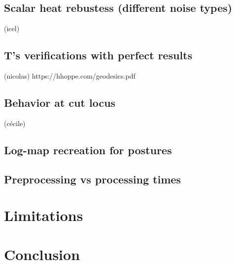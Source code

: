 \documentclass[sigconf]{acmart}
\begin{document}
\subsection{Scalar heat rebustess (different noise types)}
(icel)

\subsection{T's verifications with perfect results}
(nicolas)
https://hhoppe.com/geodesics.pdf

\subsection{Behavior at cut locus}
(cécile)
\subsection{Log-map recreation for postures}

\subsection{Preprocessing vs processing times}

\section{Limitations}
\section{Conclusion}
\end{document}
